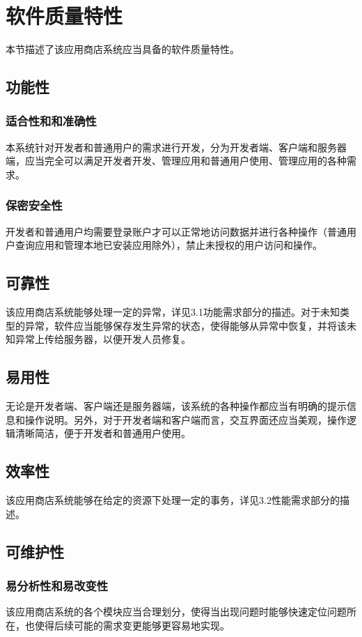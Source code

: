 \chapter{软件质量特性}
本节描述了该应用商店系统应当具备的软件质量特性。
\section{功能性}
\subsection{适合性和和准确性}
本系统针对开发者和普通用户的需求进行开发，分为开发者端、客户端和服务器端，应当完全可以满足开发者开发、管理应用和普通用户使用、管理应用的各种需求。
\subsection{保密安全性}
开发者和普通用户均需要登录账户才可以正常地访问数据并进行各种操作（普通用户查询应用和管理本地已安装应用除外），禁止未授权的用户访问和操作。

\section{可靠性}
该应用商店系统能够处理一定的异常，详见3.1功能需求部分的描述。对于未知类型的异常，软件应当能够保存发生异常的状态，使得能够从异常中恢复，并将该未知异常上传给服务器，以便开发人员修复。

\section{易用性}
无论是开发者端、客户端还是服务器端，该系统的各种操作都应当有明确的提示信息和操作说明。另外，对于开发者端和客户端而言，交互界面还应当美观，操作逻辑清晰简洁，便于开发者和普通用户使用。

\section{效率性}
该应用商店系统能够在给定的资源下处理一定的事务，详见3.2性能需求部分的描述。

\section{可维护性}
\subsection{易分析性和易改变性}
该应用商店系统的各个模块应当合理划分，使得当出现问题时能够快速定位问题所在，也使得后续可能的需求变更能够更容易地实现。
